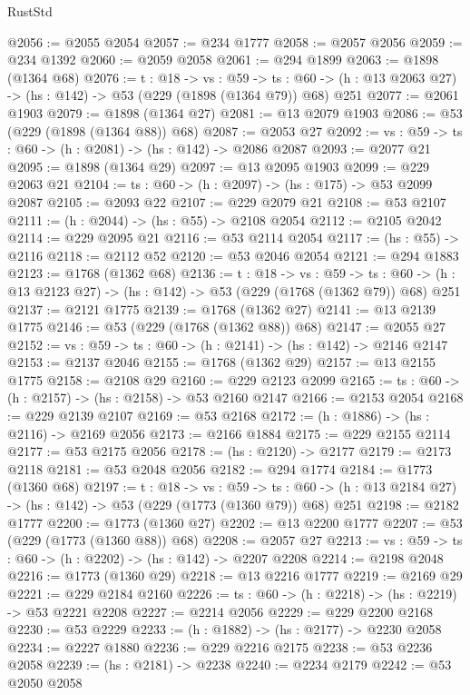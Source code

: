 \begin{lexlean}{RustStd}
\begin{coremodule}
@2056 := @2055 @2054
@2057 := @234 @1777
@2058 := @2057 @2056
@2059 := @234 @1392
@2060 := @2059 @2058
@2061 := @294 @1899
@2063 := @1898 (@1364 @68)
@2076 := {t : @18} ->
  {vs : @59} ->
  {ts : @60} -> (h : @13 @2063 @27) -> (hs : @142) -> @53 (@229 (@1898 (@1364 @79)) @68) @251
@2077 := @2061 @1903
@2079 := @1898 (@1364 @27)
@2081 := @13 @2079 @1903
@2086 := @53 (@229 (@1898 (@1364 @88)) @68)
@2087 := @2053 @27
@2092 := {vs : @59} -> {ts : @60} -> (h : @2081) -> (hs : @142) -> @2086 @2087
@2093 := @2077 @21
@2095 := @1898 (@1364 @29)
@2097 := @13 @2095 @1903
@2099 := @229 @2063 @21
@2104 := {ts : @60} -> (h : @2097) -> (hs : @175) -> @53 @2099 @2087
@2105 := @2093 @22
@2107 := @229 @2079 @21
@2108 := @53 @2107
@2111 := (h : @2044) -> (hs : @55) -> @2108 @2054
@2112 := @2105 @2042
@2114 := @229 @2095 @21
@2116 := @53 @2114 @2054
@2117 := (hs : @55) -> @2116
@2118 := @2112 @52
@2120 := @53 @2046 @2054
@2121 := @294 @1883
@2123 := @1768 (@1362 @68)
@2136 := {t : @18} ->
  {vs : @59} ->
  {ts : @60} -> (h : @13 @2123 @27) -> (hs : @142) -> @53 (@229 (@1768 (@1362 @79)) @68) @251
@2137 := @2121 @1775
@2139 := @1768 (@1362 @27)
@2141 := @13 @2139 @1775
@2146 := @53 (@229 (@1768 (@1362 @88)) @68)
@2147 := @2055 @27
@2152 := {vs : @59} -> {ts : @60} -> (h : @2141) -> (hs : @142) -> @2146 @2147
@2153 := @2137 @2046
@2155 := @1768 (@1362 @29)
@2157 := @13 @2155 @1775
@2158 := @2108 @29
@2160 := @229 @2123 @2099
@2165 := {ts : @60} -> (h : @2157) -> (hs : @2158) -> @53 @2160 @2147
@2166 := @2153 @2054
@2168 := @229 @2139 @2107
@2169 := @53 @2168
@2172 := (h : @1886) -> (hs : @2116) -> @2169 @2056
@2173 := @2166 @1884
@2175 := @229 @2155 @2114
@2177 := @53 @2175 @2056
@2178 := (hs : @2120) -> @2177
@2179 := @2173 @2118
@2181 := @53 @2048 @2056
@2182 := @294 @1774
@2184 := @1773 (@1360 @68)
@2197 := {t : @18} ->
  {vs : @59} ->
  {ts : @60} -> (h : @13 @2184 @27) -> (hs : @142) -> @53 (@229 (@1773 (@1360 @79)) @68) @251
@2198 := @2182 @1777
@2200 := @1773 (@1360 @27)
@2202 := @13 @2200 @1777
@2207 := @53 (@229 (@1773 (@1360 @88)) @68)
@2208 := @2057 @27
@2213 := {vs : @59} -> {ts : @60} -> (h : @2202) -> (hs : @142) -> @2207 @2208
@2214 := @2198 @2048
@2216 := @1773 (@1360 @29)
@2218 := @13 @2216 @1777
@2219 := @2169 @29
@2221 := @229 @2184 @2160
@2226 := {ts : @60} -> (h : @2218) -> (hs : @2219) -> @53 @2221 @2208
@2227 := @2214 @2056
@2229 := @229 @2200 @2168
@2230 := @53 @2229
@2233 := (h : @1882) -> (hs : @2177) -> @2230 @2058
@2234 := @2227 @1880
@2236 := @229 @2216 @2175
@2238 := @53 @2236 @2058
@2239 := (hs : @2181) -> @2238
@2240 := @2234 @2179
@2242 := @53 @2050 @2058

\end{coremodule}
\end{lexlean}
